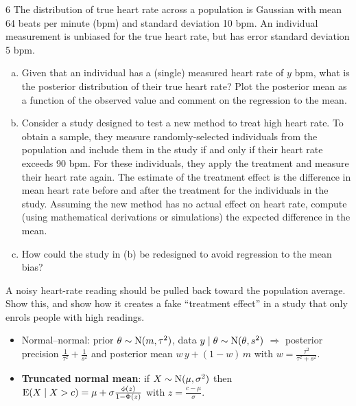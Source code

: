\documentclass[11pt]{article}
\begin{document}
\begin{problem}{6}
The distribution of true heart rate across a population is Gaussian with mean 64 beats per minute (bpm) and standard deviation 10 bpm. An individual measurement is unbiased for the true heart rate, but has error standard deviation 5 bpm.
\begin{enumerate}[(a)]
\item Given that an individual has a (single) measured heart rate of $y$ bpm, what is the posterior distribution of their true heart rate? Plot the posterior mean as a function of the observed value and comment on the regression to the mean.
\item Consider a study designed to test a new method to treat high heart rate. To obtain a sample, they measure randomly-selected individuals from the population and include them in the study if and only if their heart rate exceeds 90 bpm. For these individuals, they apply the treatment and measure their heart rate again. The estimate of the treatment effect is the difference in mean heart rate before and after the treatment for the individuals in the study. Assuming the new method has no actual effect on heart rate, compute (using mathematical derivations or simulations) the expected difference in the mean.
\item How could the study in (b) be redesigned to avoid regression to the mean bias?
\end{enumerate}
\end{problem}

\begin{restate}
A noisy heart-rate reading should be pulled back toward the population average. Show this, and show how it creates a fake ``treatment effect'' in a study that only enrols people with high readings.
\end{restate}

\begin{recall}
\begin{itemize}
\item Normal--normal: prior $\theta\sim\mathrm{N}(m,\tau^2)$, data $y\mid\theta\sim\mathrm{N}(\theta,s^2)$ $\Rightarrow$ posterior precision $\frac1{\tau^2}+\frac1{s^2}$ and posterior mean $w\,y+(1-w)\,m$ with $w=\frac{\tau^2}{\tau^2+s^2}$.
\item \textbf{Truncated normal mean}: if $X\sim\mathrm{N}(\mu,\sigma^2)$ then $\mathrm{E}(X\mid X>c)=\mu+\sigma\frac{\phi(z)}{1-\Phi(z)}$ with $z=\frac{c-\mu}{\sigma}$.
\end{itemize}
\end{recall}
\end{document}
